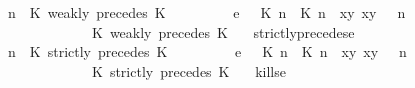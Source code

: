 \begin{isabellebody}
\ \ {\isacartoucheopen}{\isacharparenleft}{\isasymGamma}{\isacharcomma}\ n\ {\isasymturnstile}\ {\isacharparenleft}{\isacharparenleft}K\ weakly\ precedes\ K\ {\isacharhash}\ {\isasymPsi}{\isacharparenright}\ {\isasymtriangleright}\ {\isasymPhi}{\isacharparenright}\isanewline
\ \ \ \ \ {\isasymhookrightarrow}\isactrlsub e\ \ {\isacharparenleft}{\isacharparenleft}{\isacharparenleft}{\isasymlceil}{\isacharhash}\isactrlsup {\isasymle}\ K\ n{\isacharcomma}\ {\isacharhash}\isactrlsup {\isasymle}\ K\ n{\isasymrceil}\ {\isasymin}\ {\isacharparenleft}{\isasymlambda}{\isacharparenleft}x{\isacharcomma}y{\isacharparenright}{\isachardot}\ x{\isasymle}y{\isacharparenright}{\isacharparenright}\ {\isacharhash}\ {\isasymGamma}{\isacharparenright}{\isacharcomma}\ n\isanewline
\ \ \ \ \ \ \ \ \ \ \ \ {\isasymturnstile}\ {\isasymPsi}\ {\isasymtriangleright}\ {\isacharparenleft}{\isacharparenleft}K\ weakly\ precedes\ K\ {\isacharhash}\ {\isasymPhi}{\isacharparenright}{\isacharparenright}{\isacartoucheclose}\isanewline
{\isacharbar}\ strictly{\isacharunderscore}precedes{\isacharunderscore}e{\isacharcolon}\isanewline
\ \ {\isacartoucheopen}{\isacharparenleft}{\isasymGamma}{\isacharcomma}\ n\ {\isasymturnstile}\ {\isacharparenleft}{\isacharparenleft}K\ strictly\ precedes\ K\ {\isacharhash}\ {\isasymPsi}{\isacharparenright}\ {\isasymtriangleright}\ {\isasymPhi}{\isacharparenright}\isanewline
\ \ \ \ \ {\isasymhookrightarrow}\isactrlsub e\ \ {\isacharparenleft}{\isacharparenleft}{\isacharparenleft}{\isasymlceil}{\isacharhash}\isactrlsup {\isasymle}\ K\ n{\isacharcomma}\ {\isacharhash}\isactrlsup {\isacharless}\ K\ n{\isasymrceil}\ {\isasymin}\ {\isacharparenleft}{\isasymlambda}{\isacharparenleft}x{\isacharcomma}y{\isacharparenright}{\isachardot}\ x{\isasymle}y{\isacharparenright}{\isacharparenright}\ {\isacharhash}\ {\isasymGamma}{\isacharparenright}{\isacharcomma}\ n\isanewline
\ \ \ \ \ \ \ \ \ \ \ \ {\isasymturnstile}\ {\isasymPsi}\ {\isasymtriangleright}\ {\isacharparenleft}{\isacharparenleft}K\ strictly\ precedes\ K\ {\isacharhash}\ {\isasymPhi}{\isacharparenright}{\isacharparenright}{\isacartoucheclose}\isanewline
{\isacharbar}\ kills{\isacharunderscore}e{}{\isacharcolon}\isanewline

\end{isabellebody}
